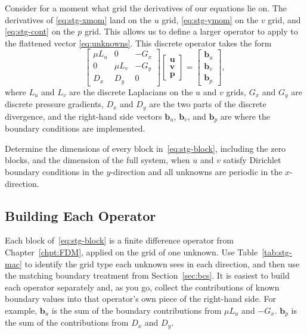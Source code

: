 Consider for a moment what grid the derivatives of our equations lie on. The derivatives of \eqref{eq:stg-xmom} land on the $u$ grid, \eqref{eq:stg-ymom} on the $v$ grid, and \eqref{eq:stg-cont} on the $p$ grid. This allows us to define a larger operator to apply to the flattened vector \eqref{eq:unknowns}. This discrete operator takes the form
\begin{equation}
    \begin{bmatrix}
        \mu L_u & 0 & -G_x \\
        0 & \mu L_v & -G_y \\
        D_x & D_y & 0
    \end{bmatrix}
    \begin{bmatrix}
        \mathbf{u} \\ \mathbf{v} \\ \mathbf{p}
    \end{bmatrix}
    =
    \begin{bmatrix}
        \mathbf{b}_u \\ \mathbf{b}_v \\ \mathbf{b}_p
    \end{bmatrix},
    \label{eq:stg-block}
\end{equation}
where $L_u$ and $L_v$ are the discrete Laplacians on the $u$ and $v$ grids, $G_x$ and $G_y$ are discrete pressure gradients, $D_x$ and $D_y$ are the two parts of the discrete divergence, and the right-hand side vectors $\mathbf{b}_u$, $\mathbf{b}_v$, and $\mathbf{b}_p$ are where the boundary conditions are implemented. 

\begin{exercise}
Determine the dimensions of every block in~\eqref{eq:stg-block}, including the zero blocks, and the dimension of the full system, when $u$ and $v$ satisfy Dirichlet boundary conditions in the $y$-direction and all unknowns are periodic in the $x$-direction.
\end{exercise}

\subsection{Building Each Operator}
\label{sec:stg-ops}

Each block of~\eqref{eq:stg-block} is a finite difference operator from Chapter~\ref{chpt:FDM}, applied on the grid of one unknown. Use Table~\ref{tab:stg-mac} to identify the grid type each unknown sees in each direction, and then use the matching boundary treatment from Section~\ref{sec:bcs}. It is easiest to build each operator separately and, as you go, collect the contributions of known boundary values into that operator's own piece of the right-hand side. For example, $\mathbf{b}_u$ is the sum of the boundary contributions from $\mu L_u$ and $-G_x$. $\mathbf{b}_p$ is the sum of the contributions from $D_x$ and $D_y$.


